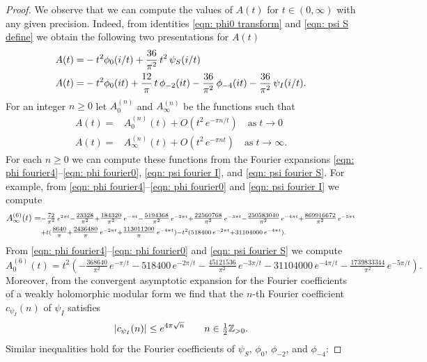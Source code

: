 \begin{proof}
\noindent We observe that we can compute the values of $A(t)$ for $t\in(0,\infty)$ with any given precision. Indeed, from identities \eqref{eqn: phi0 transform} and \eqref{eqn: psi S define} we obtain the following two presentations for $A(t)$
\begin{align}
  A(t)=&-t^2\phi_0(i/t)+\frac{36}{\pi^2}\,t^2\,\psi_S(i/t)\notag\\
  A(t)=&-t^2\phi_0(it)+\frac{12}{\pi}\,t\,\phi_{-2}(it)-\frac{36}{\pi^2}\,\phi_{-4}(it)-\frac{36}{\pi^2}\,\psi_I(i/t).\notag
\end{align}
For an integer $n\geq0$ let $A_0^{(n)}$ and  $A_{\infty}^{(n)}$ be the functions such that
\begin{align}
  A(t)=&A_0^{(n)}(t)+O(t^2\,e^{-\pi n /t})\quad\mbox{as}\;t\to0\label{eqn: A asymptotic expansion 0}\\
  A(t)=&A_\infty^{(n)}(t)+O(t^2\,e^{-\pi n t})\quad\mbox{as}\;t\to\infty.\label{eqn: A asymptotic expansion infty}
\end{align}
For each $n\geq 0$ we can compute these functions from the Fourier expansions \eqref{eqn: phi fourier4}--\eqref{eqn: phi fourier0}, \eqref{eqn: psi fourier I}, and \eqref{eqn: psi fourier S}.
  For example, from \eqref{eqn: phi fourier4}--\eqref{eqn: phi fourier0} and \eqref{eqn: psi fourier I} we compute
\begin{align}A_\infty^{(6)}(t)=&\scriptstyle-\tfrac{72}{\pi ^2}\, e^{2 \pi  t}-\tfrac{23328}{\pi ^2}+\tfrac{184320}{\pi ^2}\, e^{-\pi  t}-\tfrac{5194368}{\pi ^2}\, e^{-2 \pi  t}+\tfrac{22560768}{\pi ^2}\, e^{-3 \pi  t}-\tfrac{250583040}{\pi
    ^2}\, e^{-4 \pi  t}+\tfrac{869916672 }{\pi ^2}\,e^{-5 \pi  t}\notag\\&\scriptstyle+t(\tfrac{8640}{\pi }+\tfrac{2436480}{\pi }\, e^{-2 \pi  t}+\tfrac{113011200 }{\pi }\,e^{-4 \pi  t})-t^2(518400\,e^{-2 \pi  t}+31104000\,e^{-4 \pi  t}).\notag
\end{align}
From \eqref{eqn: phi fourier4}--\eqref{eqn: phi fourier0} and \eqref{eqn: psi fourier S} we compute
$$A_0^{(6)}(t)=t^2(-\tfrac{368640}{\pi ^2}\, e^{-\pi/t}-518400\, e^{-2\pi/t}-\tfrac{45121536}{\pi ^2}\, e^{-3\pi/t}-31104000\,e^{-4\pi/t}-\tfrac{1739833344}{\pi ^2}\, e^{-5\pi/t}).$$
Moreover, from the convergent asymptotic expansion for the Fourier coefficients of a weakly holomorphic modular form \cite[Proposition 1.12]{Bruinier} we find that the $n$-th Fourier coefficient $c_{\psi_I}(n)$ of $\psi_I$ satisfies
\begin{equation}\label{eqn: Fourier estimate 1}|c_{\psi_I}(n)|\leq e^{4\pi\sqrt{n}}\qquad n\in\tfrac 12 \mathbb{Z}_{>0}.\end{equation} Similar inequalities hold for the Fourier coefficients of $\psi_S$, $\phi_0$, $\phi_{-2}$, and $\phi_{-4}$:

\end{proof}
